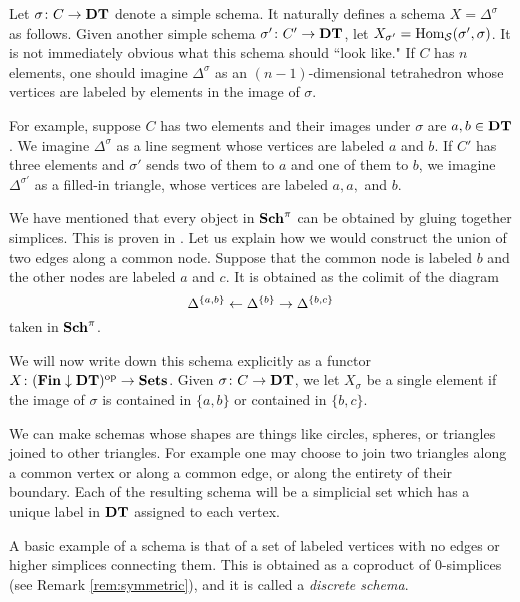 \documentclass{amsart}
\def\DT{{\bf DT}}
\def\Sch{{\bf Sch}}
\def\Fin{{\bf Fin}}
\begin{document}
\begin{example}\label{ex:simplices}

Let $\sigma\taking C\to\DT$ denote a simple schema.  It naturally defines a schema $X=\Delta^\sigma$ as follows.  Given another simple schema $\sigma'\taking C'\to\DT$, let $X_{\sigma'}=\textnormal{Hom}_\mathcal{S}(\sigma',\sigma)$.  It is not immediately obvious what this schema should ``look like."  If $C$ has $n$ elements, one should imagine $\Delta^\sigma$ as an $(n-1)$-dimensional tetrahedron whose vertices are labeled by elements in the image of $\sigma$.

For example, suppose $C$ has two elements and their images under $\sigma$ are $a,b\in\DT$.  We imagine $\Delta^\sigma$ as a line segment whose vertices are labeled $a$ and $b$.  If $C'$ has three elements and $\sigma'$ sends two of them to $a$ and one of them to $b$, we imagine $\Delta^{\sigma'}$ as a filled-in triangle, whose vertices are labeled $a,a,$ and $b$. 

\end{example}

\begin{example}

We have mentioned that every object in $\Sch^\pi$ can be obtained by gluing together simplices.  This is proven in \cite[2.15.6]{Bor1}.  Let us explain how we would construct the union of two edges along a common node.  Suppose that the common node is labeled $b$ and the other nodes are labeled $a$ and $c$.  It is obtained as the colimit of the diagram $$\Delta^{\{a,b\}}\leftarrow\Delta^{\{b\}}\rightarrow\Delta^{\{b,c\}}$$ taken in $\Sch^\pi$.

We will now write down this schema explicitly as a functor $X\taking(\Fin\down\DT)\op\to\Sets$.  Given $\sigma\taking C\to\DT$, we let $X_\sigma$ be a single element if the image of $\sigma$ is contained in $\{a,b\}$ or contained in $\{b,c\}$.  

\end{example}

\begin{example}\label{ex:gluing}

We can make schemas whose shapes are things like circles, spheres, or triangles joined to other triangles.  For example one may choose to join two triangles along a common vertex or along a common edge, or along the entirety of their boundary.  Each of the resulting schema will be a simplicial set which has a unique label in $\DT$ assigned to each vertex.

A basic example of a schema is that of a set of labeled vertices with no edges or higher simplices connecting them.  This is obtained as a coproduct of $0$-simplices (see Remark \ref{rem:symmetric}), and it is called a {\em discrete schema}.

\end{example}
\end{document}
